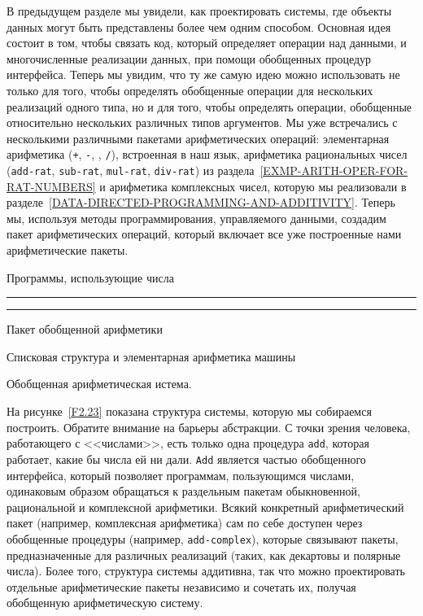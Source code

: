 В предыдущем разделе мы увидели, как проектировать системы,
где объекты данных могут быть представлены  более чем одним
способом.  Основная идея состоит в том, чтобы связать код, который
определяет операции над данными, и многочисленные реализации данных,
при помощи  обобщенных процедур интерфейса.  Теперь мы увидим, что ту
же самую идею можно использовать не только для того, чтобы определять
обобщенные операции для нескольких реализаций одного типа, но и для
того, чтобы определять операции, обобщенные относительно нескольких
различных типов аргументов.  Мы уже встречались с несколькими
различными пакетами арифметических операций: элементарная арифметика
({\tt +}, {\tt -}, {\tt *}, {\tt /}),
встроенная в наш язык, арифметика рациональных чисел
({\tt add-rat}, {\tt sub-rat}, {\tt mul-rat},
{\tt div-rat}) из раздела~\ref{EXMP-ARITH-OPER-FOR-RAT-NUMBERS}
и арифметика комплексных чисел, которую мы реализовали в 
разделе~\ref{DATA-DIRECTED-PROGRAMMING-AND-ADDITIVITY}.  
Теперь мы,
используя методы программирования, управляемого данными,
создадим пакет арифметических операций, который включает все
уже построенные нами арифметические пакеты.


\begin{cntrfig}
Программы, использующие числа

\medskip

\rule{4cm}{0,5pt}\rule{4cm}{0,5pt}

\medskip

Пакет обобщенной арифметики

\medskip



Списковая структура и элементарная арифметика машины

\caption{Обобщенная арифметическая истема.
}
\label{F2.23}

\end{cntrfig}

На рисунке~\ref{F2.23} показана структура
системы, которую мы собираемся построить.  Обратите внимание на
барьеры абстракции.  С точки зрения человека, работающего с <<числами>>,
есть только одна процедура {\tt add}, которая работает, какие
бы числа ей ни дали. {\tt Add} является частью обобщенного
интерфейса, который позволяет программам, пользующимся числами,
одинаковым образом обращаться к раздельным пакетам обыкновенной,
рациональной и комплексной арифметики.  Всякий конкретный
арифметический пакет (например, комплексная арифметика) сам по себе
доступен через обобщенные процедуры (например,
{\tt add-complex}), которые связывают пакеты, предназначенные
для различных реализаций (таких, как декартовы и полярные числа).
Более того, структура системы аддитивна, так что можно проектировать
отдельные арифметические пакеты независимо и сочетать их, получая
обобщенную арифметическую систему.

